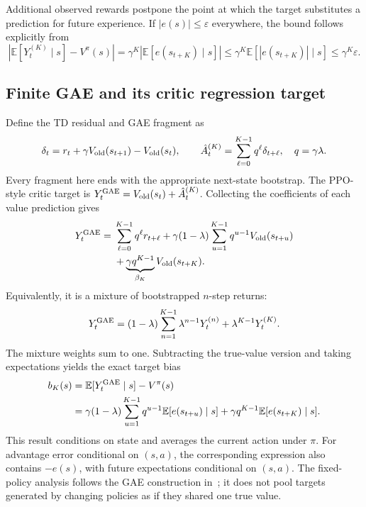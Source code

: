 \documentclass[11pt,a4paper]{article}
\numberwithin{equation}{section}
\newcommand{\E}{\mathbb E}
\begin{document}
Additional observed rewards postpone the point at which the target substitutes
a prediction for future experience. If $|e(s)|\le\varepsilon$ everywhere,
the bound follows explicitly from
\[
 \left|\E[Y_t^{(K)}\mid s]-V^\pi(s)\right|
 =\gamma^K\left|\E[e(s_{t+K})\mid s]\right|
 \le\gamma^K\E[|e(s_{t+K})|\mid s]
 \le\gamma^K\varepsilon.
\]

\subsection{Finite GAE and its critic regression target}
Define the TD residual and GAE fragment as
\begin{equation}
 \delta_t=r_t+\gamma V_{\rm old}(s_{t+1})-V_{\rm old}(s_t),\qquad
 \hat A_t^{(K)}=\sum_{\ell=0}^{K-1}q^\ell\delta_{t+\ell},\quad q=\gamma\lambda.
\end{equation}
Every fragment here ends with the appropriate next-state bootstrap.
The PPO-style critic target is $Y_t^{\rm GAE}=V_{\rm old}(s_t)+\hat A_t^{(K)}$.
Collecting the coefficients of each value prediction gives
\begin{align}\label{eq:target}
 Y_t^{\rm GAE}
 ={}&\sum_{\ell=0}^{K-1}q^\ell r_{t+\ell}
 +\gamma(1-\lambda)\sum_{u=1}^{K-1}q^{u-1}V_{\rm old}(s_{t+u})\nonumber\\
 &+\underbrace{\gamma q^{K-1}}_{\beta_K}V_{\rm old}(s_{t+K}).
\end{align}
Equivalently, it is a mixture of bootstrapped $n$-step returns:
\begin{equation}
 Y_t^{\rm GAE}=(1-\lambda)\sum_{n=1}^{K-1}\lambda^{n-1}Y_t^{(n)}
                 +\lambda^{K-1}Y_t^{(K)}.
\end{equation}
The mixture weights sum to one. Subtracting the true-value version and taking
expectations yields the exact target bias
\begin{align}\label{eq:bias}
 b_K(s)&=\E[Y_t^{\rm GAE}\mid s]-V^\pi(s)\nonumber\\
 &=\gamma(1-\lambda)\sum_{u=1}^{K-1}q^{u-1}\E[e(s_{t+u})\mid s]
   +\gamma q^{K-1}\E[e(s_{t+K})\mid s].
\end{align}
This result conditions on state and averages the current action under $\pi$.
For advantage error conditional on $(s,a)$, the corresponding expression also
contains $-e(s)$, with future expectations conditional on $(s,a)$.
The fixed-policy analysis follows the GAE construction in~\cite{gae}; it does not
pool targets generated by changing policies as if they shared one true value.
\end{document}
